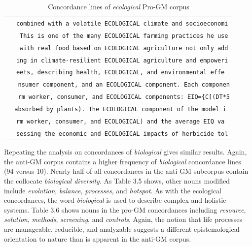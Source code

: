 \begin{table}[h]
\begin{footnotesize}
\centering
\def\arraystretch{1.1}%
 \begin{tabular}{c} 

\texttt{\ \ combined with a volatile ECOLOGICAL climate and socioeconomi} \\ 
\texttt{\ \ \ This is one of the many ECOLOGICAL farming practices he use} \\ 
\texttt{\ \ \ with real food based on ECOLOGICAL agriculture not only add} \\ 
\texttt{\ \ ing in climate-resilient ECOLOGICAL agriculture and empoweri} \\ 
\texttt{\ eets, describing health, ECOLOGICAL, and environmental effe} \\ 
\texttt{\ \ \ nsumer component, and an ECOLOGICAL component. Each componen} \\ 
\texttt{\ \ \ rm worker, consumer, and ECOLOGICAL components: EIQ=\{C[(DT*5} \\ 
\texttt{\ absorbed by plants). The ECOLOGICAL component of the model i} \\ 
\texttt{\  rm worker, consumer, and ECOLOGICAL) and the average EIQ va} \\ 
\texttt{\ \ sessing the economic and ECOLOGICAL impacts of herbicide tol} \\ 
 \end{tabular}
\caption{Concordance lines of \textit{ecological} Pro-GM corpus}
\label{tab:table1}
\end{footnotesize}
\end{table}

Repeating the analysis on concordances of \textit{biological} gives similar results. Again, the anti-GM corpus contains a higher frequency of \textit{biological} concordance lines (94 versus 10). Nearly half of all concordances in the anti-GM subcorpus contain the collocate \textit{biological diversity}. As Table 3.5 shows, other nouns modified include \textit{evolution}, \textit{balance}, \textit{processes}, and \textit{hotspot}. As with the ecological concordances, the word \textit{biological} is used to describe complex and holistic systems. Table 3.6 shows nouns in the pro-GM concordances including \textit{resource}, \textit{solution}, \textit{methods}, \textit{screening}, and \textit{controls}. Again, the notion that life processes are manageable, reducible, and analyzable suggests a different epistemological orientation to nature than is apparent in the anti-GM corpus.

